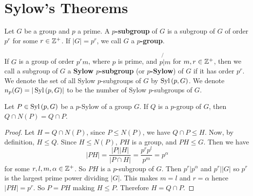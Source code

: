 \section{Sylow's Theorems}
\label{section_4.5}

\begin{definition}
  Let $G$ be a group and $p$ a prime. A  \textbf{$p$-subgroup} of $G$ is a
  subgroup of $G$ of order  $p^r$ for some $r \in \mathbb{Z}^+$. If $|G|=p^r$, we
  call  $G$ a  \textbf{$p$-group}.
\end{definition}

\begin{definition}
  If $G$ is a group of order  $p^rm$, where  $p$ is prime, and  $p \not{|} m$
  for  $m,r \in \mathbb{Z}^+$, then we call a subgroup of $G$ a \textbf{Sylow
  $p$-subgroup} (or \textbf{$p$-Sylow}) of $G$ if it has order $p^r$. We
  denote the set of all Sylow $p$-subgroups of $G$ by  $\operatorname{Syl}{(p,G)}$. We
  denote $n_p(G)=|\operatorname{Syl}{(p,G)}|$ to be the number of Sylow $p$-subgroups of
  $G$.
\end{definition}

\begin{lemma}\label{lemma_4.5.1}
  Let $P \in \operatorname{Syl}{(p,G)}$ be a $p$-Sylow of a group  $G$. If  $Q$ is a
  $p$-group of  $G$, then  $Q \cap N(P)=Q \cap P$.
\end{lemma}
\begin{proof}
  Let $H=Q \cap N(P)$, since $P \leq N(P)$, we have $Q \cap P \leq H$. Now, by
  definition, $H \leq Q$. Since $H \leq N(P)$, $PH$ is a group, and  $PH \leq
  G$. Then we have
  \begin{equation*}
    |PH|=\frac{|P||H|}{|P \cap H|}=\frac{p^rp^l}{p^m}=p^\alpha
  \end{equation*}
  for some $r,l,m,\alpha \in \mathbb{Z}^+$. So $PH$ is a  $p$-subgroup of  $G$. Then
  $p^r|p^\alpha$ and  $p^r||G|$ so $p^r$ is the largest prime power
  dividing  $|G|$. This makes $m=l$ and $r=\alpha$ hence $|PH|=p^r$.
  So $P=PH$ making $H \leq P$. Therefore $H=Q \cap P$.
\end{proof}

